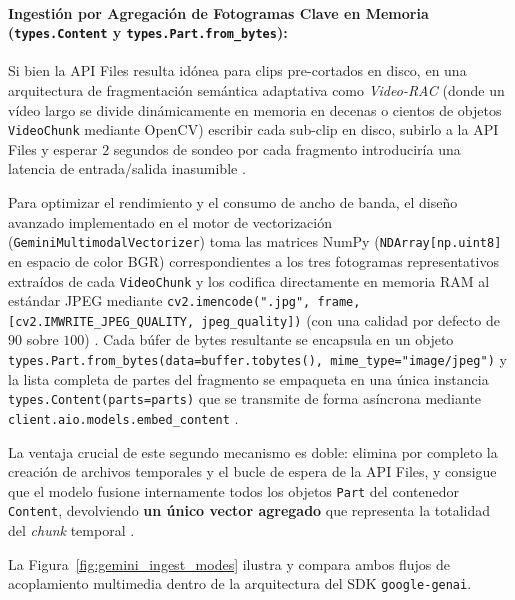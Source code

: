 \paragraph{Ingestión por Agregación de Fotogramas Clave en Memoria (\texttt{types.Content} y \texttt{types.Part.from\_bytes}):}
Si bien la API Files resulta idónea para clips pre-cortados en disco, en una arquitectura de fragmentación semántica adaptativa como \textit{Video-RAC} (donde un vídeo largo se divide dinámicamente en memoria en decenas o cientos de objetos \texttt{VideoChunk} mediante OpenCV) escribir cada sub-clip en disco, subirlo a la API Files y esperar $2$ segundos de sondeo por cada fragmento introduciría una latencia de entrada/salida inasumible \cite{video_rac2025, gemini_emb2_docs}. %

Para optimizar el rendimiento y el consumo de ancho de banda, el diseño avanzado implementado en el motor de vectorización (\texttt{GeminiMultimodalVectorizer}) toma las matrices NumPy (\texttt{NDArray[np.uint8]} en espacio de color BGR) correspondientes a los tres fotogramas representativos extraídos de cada \texttt{VideoChunk} y los codifica directamente en memoria RAM al estándar JPEG mediante \texttt{cv2.imencode(".jpg", frame, [cv2.IMWRITE\_JPEG\_QUALITY, jpeg\_quality])} (con una calidad por defecto de $90$ sobre $100$) \cite{gemini_emb2_docs}. %
Cada búfer de bytes resultante se encapsula en un objeto \texttt{types.Part.from\_bytes(data=buffer.tobytes(), mime\_type="image/jpeg")} y la lista completa de partes del fragmento se empaqueta en una única instancia \texttt{types.Content(parts=parts)} que se transmite de forma asíncrona mediante \texttt{client.aio.models.embed\_content} \cite{gemini_emb2_docs}. %

La ventaja crucial de este segundo mecanismo es doble: elimina por completo la creación de archivos temporales y el bucle de espera de la API Files, y consigue que el modelo fusione internamente todos los objetos \texttt{Part} del contenedor \texttt{Content}, devolviendo \textbf{un único vector agregado} que representa la totalidad del \textit{chunk} temporal \cite{gemini_emb2_docs}. %

La Figura~\ref{fig:gemini_ingest_modes} ilustra y compara ambos flujos de acoplamiento multimedia dentro de la arquitectura del SDK \texttt{google-genai}. %

